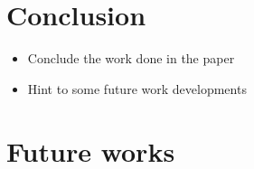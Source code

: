 \documentclass[runningheads,a4paper]{llncs}
\begin{document}
%
%
%




\section{Conclusion}

\begin{itemize}
	\item Conclude the work done in the paper
	\item Hint to some future work developments
\end{itemize}


\section{Future works}





\end{document}
